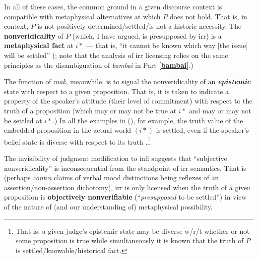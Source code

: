 In all of these cases, the common ground in a given discourse context is compatible with metaphysical alternatives at which $ P $ does not hold. That is, in context, $ P $ is not positively determined/settled/is not a historic necessity. The \textbf{nonveridicality} of $ P $ (which, I have argued, is presupposed by \gls{irr}) is a \textbf{metaphysical fact} at $ i* $ --- that is, ``it cannot be known which way [the issue] will be settled'' (\citealp[79]{Condoravdi2002}; note that the analysis of \gls{irr} licensing relies on the same principles as the disambiguation of \textit{bambai} in Part \textbf{\ref{bambai}}.)

The function of \textit{mak}, meanwhile, is to signal the nonveridicality of an \textit{\textbf{epistemic}} state with respect to a given proposition. That is, it is taken to indicate a property of the speaker's attitude (their level of commitment) with respect to the truth of a proposition (which may or may not be true at $ i* $ and may or may not be settled at $ i* $.) In all the examples in (), for example, the truth value of the embedded proposition in the actual world $ (i*) $ is settled, even if the speaker's belief state is diverse with respect to its truth \citep[see also][79]{Condoravdi2002}.\footnote{That is, a given judge's epistemic state may be diverse w/r/t whether or not some proposition is true while simultaneously it is known that the truth of \textit{P} is settled/knowable/historical fact.}

The invisibility of judgment modification to \gls{infl} suggests that ``subjective nonveridicality'' is inconsequential from the standpoint of \gls{irr} semantics. That is (perhaps \textit{contra} claims of verbal mood distinctions being reflexes of an assertion/non-assertion dichotomy), \gls{irr} is only licensed when the truth of a given proposition is \textbf{objectively nonverifiable} (``\textit{presupposed} to be settled'') in view of the nature of (and our understanding of) metaphysical possibility.

